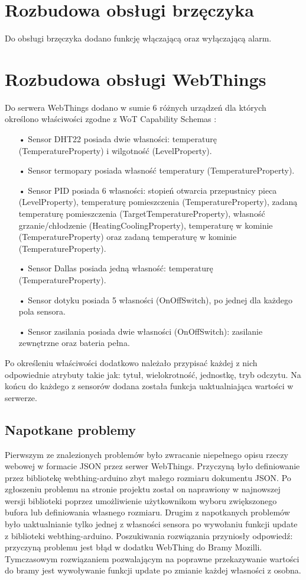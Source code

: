 \documentclass[11pt]{report}
\begin{document}
 \section{Rozbudowa obsługi brzęczyka}
 Do obsługi brzęczyka dodano funkcję włączającą oraz wyłączającą alarm.
 
 \section{Rozbudowa obsługi WebThings}
 Do serwera WebThings dodano w sumie 6 różnych urządzeń dla których określono właściwości zgodne z  WoT Capability Schemas \cite{wotschemas2020}:
 \begin{enumerate}
 \item[•] Sensor DHT22 posiada dwie własności: temperaturę (TemperatureProperty) i wilgotność (LevelProperty).
 \item[•] Sensor termopary posiada własność temperatury (TemperatureProperty).
 \item[•] Sensor PID posiada 6 własności: stopień otwarcia przepustnicy pieca (LevelProperty), temperaturę pomieszczenia (TemperatureProperty), zadaną temperaturę pomieszczenia (TargetTemperatureProperty), własność grzanie/chłodzenie (HeatingCoolingProperty), temperaturę w kominie (TemperatureProperty) oraz zadaną temperaturę w kominie (TemperatureProperty).
 \item[•] Sensor Dallas posiada jedną własność: temperaturę (TemperatureProperty).
 \item[•] Sensor dotyku posiada 5 własności (OnOffSwitch), po jednej dla każdego pola sensora.
 \item[•] Sensor zasilania posiada dwie własności (OnOffSwitch): zasilanie zewnętrzne oraz bateria pełna.
 \end{enumerate}
 Po określeniu właściwości dodatkowo należało przypisać każdej z nich odpowiednie atrybuty takie jak: tytuł, wielokrotność, jednostkę, tryb odczytu.
 Na końcu do każdego z sensorów dodana została funkcja uaktualniająca wartości w serwerze.
 \subsection{Napotkane problemy}
 Pierwszym ze znalezionych problemów było zwracanie niepełnego opisu rzeczy webowej w formacie JSON przez serwer WebThings. Przyczyną było definiowanie przez bibliotekę webthing-arduino zbyt małego rozmiaru dokumentu JSON. Po zgłoszeniu problemu na stronie projektu został on naprawiony w najnowszej wersji biblioteki poprzez umożliwienie użytkownikom wyboru zwiększonego bufora lub definiowania własnego rozmiaru.
 Drugim z napotkanych problemów było uaktualnianie tylko jednej z własności sensora po wywołaniu funkcji update z biblioteki webthing-arduino. Poszukiwania rozwiązania przyniosły odpowiedź: przyczyną problemu jest błąd w dodatku WebThing do Bramy Mozilli. Tymczasowym rozwiązaniem pozwalającym na poprawne przekazywanie wartości do bramy jest wywoływanie funkcji update po zmianie każdej własności z osobna.
\end{document}

